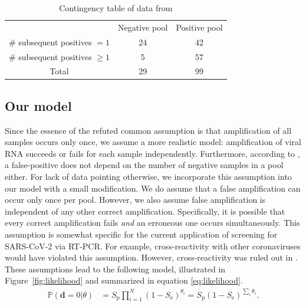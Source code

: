 \documentclass{article}
\newcommand{\Se}{S_\text{e}}
\renewcommand{\Pr}{\mathbb{P}}
\newcommand{\data}{\mathbf{d}}
\newcommand{\sens}{S_{\text{e}}}
\newcommand{\spec}{S_{\text{p}}}
\begin{document}
\begin{table}[h]
\centering
\begin{tabular}{ c c c }
                                & Negative pool  & Positive pool \\%
\# subsequent positives $=1$    & 24             & 42            \\%
\# subsequent positives $\geq1$ & 5              & 57            \\%
 Total                          & 29             & 99            \\%
\end{tabular}
\caption{Contingency table of data from \cite{Salazar}}\label{table}
\end{table}


\subsection*{Our model}\label{subsec:ours}
Since the essence of the refuted common assumption is that
amplification of all samples occurs only once, we assume a more
realistic model: amplification of viral RNA succeeds or fails for each
sample independently. Furthermore, according to \cite{Simplistic1,
  Simplistic2, Kim, OptimalDorfmanPool}, a false-positive does not
depend on the number of negative samples in a pool either. For lack of
data pointing otherwise, we incorporate this assumption into our model
with a small modification. We do assume that a false amplification can
occur only once per pool. However, we also assume false amplification
is independent of any other correct amplification. Specifically, it is
possible that every correct amplification fails \emph{and} an
erroneous one occurs simultaneously. This assumption is somewhat
specific for the current application of screening for SARS-CoV-2 via
RT-PCR. For example, cross-reactivity with other coronaviruses would
have violated this assumption. However, cross-reactivity was ruled out
in \cite{KitComparison}. These assumptions lead to the following
model, illustrated in Figure~\ref{fig:likelihood} and summarized in
equation \eqref{eq:likelihood}.
\begin{align}\label{eq:likelihood}
    \Pr(\data=0 | \theta) &= \spec\prod_{i=1}^N (1-\sens)^{\theta_i} =
    \spec(1-\Se)^{\sum_i\theta_i}.
\end{align}
\end{document}
